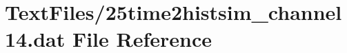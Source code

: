 \hypertarget{25time2histsim__channel14_8dat}{}\section{Text\+Files/25time2histsim\+\_\+channel14.dat File Reference}
\label{25time2histsim__channel14_8dat}
